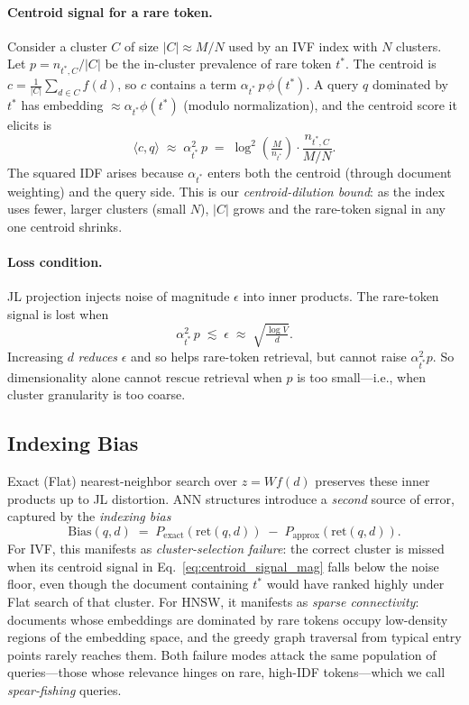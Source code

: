 \documentclass[conference]{IEEEtran}
\begin{document}
\paragraph{Centroid signal for a rare token.} Consider a cluster $C$ of size $|C|\approx M/N$ used by an IVF index with $N$ clusters. Let $p=n_{t^*,C}/|C|$ be the in-cluster prevalence of rare token $t^*$. The centroid is $c=\frac{1}{|C|}\sum_{d\in C}f(d)$, so $c$ contains a term $\alpha_{t^*}\,p\,\phi(t^*)$. A query $q$ dominated by $t^*$ has embedding $\approx\alpha_{t^*}\phi(t^*)$ (modulo normalization), and the centroid score it elicits is
\begin{equation}
\langle c, q\rangle \;\approx\; \alpha_{t^*}^2\,p \;=\; \log^2\!\left(\tfrac{M}{n_{t^*}}\right)\cdot\frac{n_{t^*,C}}{M/N}.
\label{eq:centroid_signal_mag}
\end{equation}
The squared IDF arises because $\alpha_{t^*}$ enters both the centroid (through document weighting) and the query side. This is our \emph{centroid-dilution bound}: as the index uses fewer, larger clusters (small $N$), $|C|$ grows and the rare-token signal in any one centroid shrinks.

\paragraph{Loss condition.} JL projection injects noise of magnitude $\epsilon$ into inner products. The rare-token signal is lost when
\begin{equation}
\alpha_{t^*}^2\,p \;\lesssim\; \epsilon \;\approx\; \sqrt{\tfrac{\log V}{d}}.
\label{eq:signal_loss_general}
\end{equation}
Increasing $d$ \emph{reduces} $\epsilon$ and so helps rare-token retrieval, but cannot raise $\alpha_{t^*}^2 p$. So dimensionality alone cannot rescue retrieval when $p$ is too small---i.e., when cluster granularity is too coarse.

\subsection{Indexing Bias}

Exact (Flat) nearest-neighbor search over $z=Wf(d)$ preserves these inner products up to JL distortion. ANN structures introduce a \emph{second} source of error, captured by the \emph{indexing bias}
\begin{equation}
\mathrm{Bias}(q,d) \;=\; P_{\text{exact}}(\mathrm{ret}(q,d)) \;-\; P_{\text{approx}}(\mathrm{ret}(q,d)).
\label{eq:indexing_bias}
\end{equation}
For IVF, this manifests as \emph{cluster-selection failure}: the correct cluster is missed when its centroid signal in Eq.~\eqref{eq:centroid_signal_mag} falls below the noise floor, even though the document containing $t^*$ would have ranked highly under Flat search of that cluster. For HNSW, it manifests as \emph{sparse connectivity}: documents whose embeddings are dominated by rare tokens occupy low-density regions of the embedding space, and the greedy graph traversal from typical entry points rarely reaches them. Both failure modes attack the same population of queries---those whose relevance hinges on rare, high-IDF tokens---which we call \emph{spear-fishing} queries.
\end{document}
